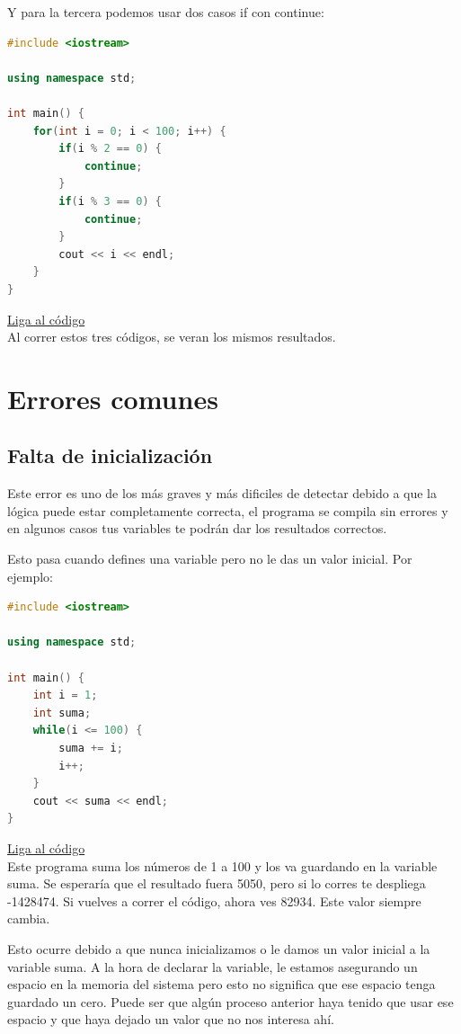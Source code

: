 \documentclass{article}
\begin{document}
Y para la tercera podemos usar dos casos if con continue:

\begin{lstlisting}[language=C++, caption=Continue]
#include <iostream>

using namespace std;

int main() {
    for(int i = 0; i < 100; i++) {
        if(i % 2 == 0) {
            continue;
        }
        if(i % 3 == 0) {
            continue;
        }
        cout << i << endl;
    }
}
\end{lstlisting}
\href{https://repl.it/@Jamesscn/Numeros-no-hexagonales}{Liga al código}\\

Al correr estos tres códigos, se veran los mismos resultados.

\section{Errores comunes}

\subsection{Falta de inicialización}
Este error es uno de los más graves y más dificiles de detectar debido a que la lógica puede estar completamente correcta, el programa se compila sin errores y en algunos casos tus variables te podrán dar los resultados correctos.

Esto pasa cuando defines una variable pero no le das un valor inicial. Por ejemplo:

\begin{lstlisting}[language=C++, caption=Error de inicialización]
#include <iostream>

using namespace std;

int main() {
    int i = 1;
    int suma;
    while(i <= 100) {
        suma += i;
        i++;
    }
    cout << suma << endl;
}
\end{lstlisting}
\href{https://repl.it/@Jamesscn/Suma-Imposible}{Liga al código}\\

Este programa suma los números de 1 a 100 y los va guardando en la variable suma. Se esperaría que el resultado fuera 5050, pero si lo corres te despliega -1428474. Si vuelves a correr el código, ahora ves 82934. Este valor siempre cambia.

Esto ocurre debido a que nunca inicializamos o le damos un valor inicial a la variable suma. A la hora de declarar la variable, le estamos asegurando un espacio en la memoria del sistema pero esto no significa que ese espacio tenga guardado un cero. Puede ser que algún proceso anterior haya tenido que usar ese espacio y que haya dejado un valor que no nos interesa ahí.
\end{document}
